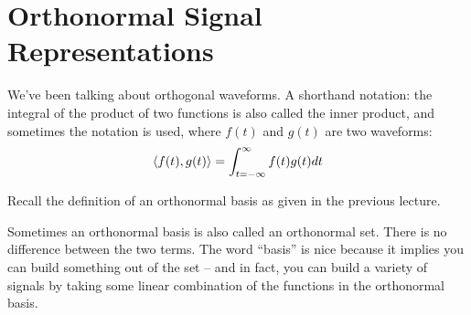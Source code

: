 




\section{Orthonormal Signal Representations}


We've been talking about orthogonal waveforms. A shorthand notation: the integral of the product of two functions is also called the inner product, and sometimes the notation is used, where $f(t)$ and $g(t)$ are two waveforms:
\[
 \langle f(t), g(t) \rangle = {\int_{t = -\infty}^{\infty} f(t) g(t) d{t} }
\]

Recall the definition of an orthonormal basis as given in the previous lecture.


Sometimes an orthonormal basis is also called an orthonormal set. There is no difference between the two terms.  The word ``basis'' is nice because it implies you can build something out of the set -- and in fact, you can build a variety of signals by taking some linear combination of the functions in the orthonormal basis.  

